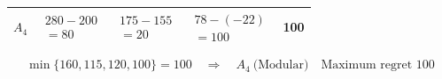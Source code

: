 {\begin{minipage}[t]{0.51\textwidth}
\begin{tabular}{@{}lcccc@{}}
    $A_4$ & $\begin{gathered}280-200\\=80\end{gathered}$ & $\begin{gathered}175-155\\=20\end{gathered}$ & $\begin{gathered}78-(-22)\\=100\end{gathered}$ & 100\\
    \bottomrule
  \end{tabular}
\end{minipage}
\[
  \min\{160,115,120,100\}=100
  \quad\Longrightarrow\quad
  \boxed{A_4\ \text{(Modular)}\quad\text{Maximum regret }100}
\]
}

\clearpage
{}
